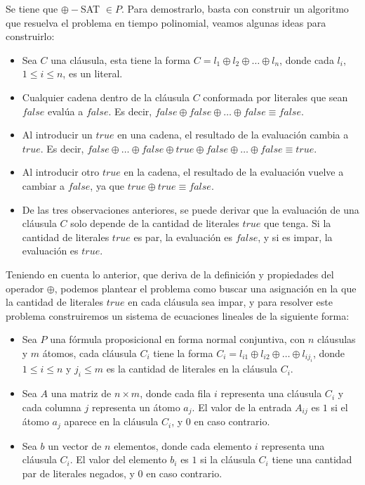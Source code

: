 \documentclass[letterpaper, 12pt]{article}
\begin{document}
\begin{enumerate}
Se tiene que $\oplus-$SAT $\in P$. Para demostrarlo, basta con construir un algoritmo que resuelva el problema en tiempo polinomial, veamos algunas ideas para construirlo:
\begin{itemize}
    \item Sea $C$ una cláusula, esta tiene la forma $C = l_1 \oplus l_2 \oplus \dots \oplus l_n$, donde cada $l_i$, $1 \leq i \leq n$, es un literal.
    \item Cualquier cadena dentro de la cláusula $C$ conformada por literales que sean $false$ evalúa a $false$. Es decir, $false \oplus false \oplus \dots \oplus false \equiv false$.
    \item Al introducir un $true$ en una cadena, el resultado de la evaluación cambia a $true$. Es decir, $false \oplus \dots \oplus false \oplus true \oplus false \oplus \dots \oplus false \equiv true$.
    \item Al introducir otro $true$ en la cadena, el resultado de la evaluación vuelve a cambiar a $false$, ya que $true \oplus true \equiv false$.
    \item De las tres observaciones anteriores, se puede derivar que la evaluación de una cláusula $C$ solo depende de la cantidad de literales $true$ que tenga. Si la cantidad de literales $true$ es par, la evaluación es $false$, y si es impar, la evaluación es $true$.
\end{itemize}

Teniendo en cuenta lo anterior, que deriva de la definición y propiedades del operador $\oplus$, podemos plantear el problema como buscar una asignación en la que la cantidad de literales $true$ en cada cláusula sea impar, y para resolver este problema construiremos un sistema de ecuaciones lineales de la siguiente forma:

\begin{itemize}
    \item Sea $P$ una fórmula proposicional en forma normal conjuntiva, con $n$ cláusulas y $m$ átomos, cada cláusula $C_i$ tiene la forma $C_i = l_{i1} \oplus l_{i2} \oplus \dots \oplus l_{ij_i}$, donde $1 \leq i \leq n$ y $j_i \leq m$ es la cantidad de literales en la cláusula $C_i$.
    \item Sea $A$ una matriz de $n \times m$, donde cada fila $i$ representa una cláusula $C_i$ y cada columna $j$ representa un átomo $a_j$. El valor de la entrada $A_{ij}$ es $1$ si el átomo $a_j$ aparece en la cláusula $C_i$, y $0$ en caso contrario.
    \item Sea $b$ un vector de $n$ elementos, donde cada elemento $i$ representa una cláusula $C_i$. El valor del elemento $b_i$ es $1$ si la cláusula $C_i$ tiene una cantidad par de literales negados, y $0$ en caso contrario.
\end{itemize}


\end{enumerate}
\end{document}
